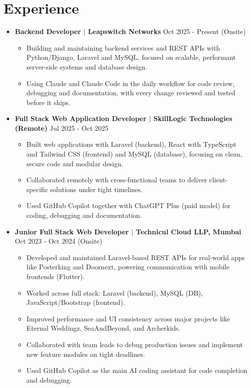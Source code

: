 \documentclass[a4paper,11pt]{article}
\begin{document}
\section{\textbf{Experience}}
  \begin{itemize}[leftmargin=0.13in]
      \item \textbf{Backend Developer $|$ Leapswitch Networks} \hfill{Oct 2025 - Present (Onsite)}
\begin{itemize}
    \item Building and maintaining backend services and REST APIs with Python/Django, Laravel and MySQL, focused on scalable, performant server-side systems and database design.
    \item Using Claude and Claude Code in the daily workflow for code review, debugging and documentation, with every change reviewed and tested before it ships.
\end{itemize}

      \item \textbf{Full Stack Web Application Developer $|$ SkillLogic Technologies (Remote)} \hfill{Jul 2025 - Oct 2025}
\begin{itemize}
    \item Built web applications with Laravel (backend), React with TypeScript and Tailwind CSS (frontend) and MySQL (database), focusing on clean, secure code and modular design.
    \item Collaborated remotely with cross-functional teams to deliver client-specific solutions under tight timelines.
    \item Used GitHub Copilot together with ChatGPT Plus (paid model) for coding, debugging and documentation.
\end{itemize}

      \item \textbf{Junior Full Stack Web Developer $|$ Technicul Cloud LLP, Mumbai} \hfill{Oct 2023 - Oct 2024 (Onsite)}
\begin{itemize}
    \item Developed and maintained Laravel-based REST APIs for real-world apps like Posterking and Doornext, powering communication with mobile frontends (Flutter).
    \item Worked across full stack: Laravel (backend), MySQL (DB), JavaScript/Bootstrap (frontend).
    \item Improved performance and UI consistency across major projects like Eternal Weddingz, SeaAndBeyond, and Archerkids.
    \item Collaborated with team leads to debug production issues and implement new feature modules on tight deadlines.
    \item Used GitHub Copilot as the main AI coding assistant for code completion and debugging.
\end{itemize}
  \end{itemize}
\end{document}
